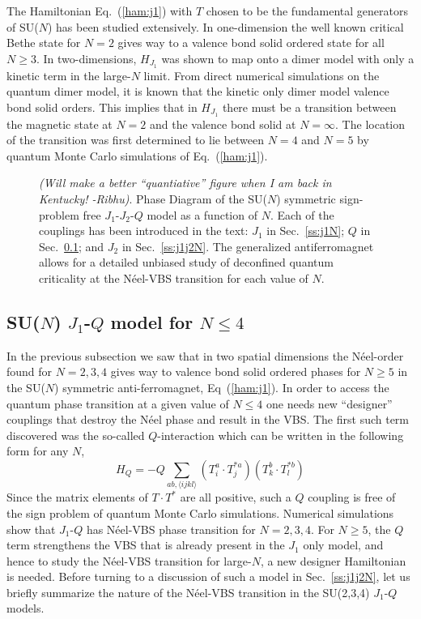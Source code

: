 \documentclass[range]{ar2e}
\begin{document}
The Hamiltonian Eq.~(\ref{ham:j1}) with $T$ chosen to be the
fundamental generators of SU($N$) has been studied extensively. In
one-dimension the well known critical Bethe state for $N=2$ gives way to a valence bond solid
ordered state for all $N\geq 3$.   In two-dimensions, $H_{J_1}$ was shown to map onto a dimer model
with only a kinetic term
in the large-$N$ limit. From direct numerical simulations
on the quantum dimer model, it is known that the kinetic only dimer model
valence bond solid orders.  This implies that in $H_{J_1}$ there must be a transition
between the magnetic state at $N=2$ and the valence bond solid at
$N=\infty$.  The location of the transition was first
determined to lie between $N=4$ and $N=5$ by quantum Monte Carlo
simulations of Eq.~(\ref{ham:j1}).


\begin{figure}
  \caption{ \label{fig:pdj1j2q} {\em (Will make a better ``quantiative''
      figure when  I am back in Kentucky! -Ribhu)}. Phase Diagram of the
    SU($N$) symmetric sign-problem free
    $J_1$-$J_2$-$Q$ model as a function of $N$. Each of the couplings has been introduced
    in the text: $J_1$ in Sec.~\ref{ss:j1N}; $Q$ in Sec.~\ref{ss:jqN};
  and $J_2$ in Sec.~\ref{ss:j1j2N}. The generalized antiferromagnet
  allows for a detailed unbiased study of deconfined quantum
  criticality at the N\'eel-VBS transition for each value of $N$. }
\end{figure}


\subsection{SU($N$) $J_1$-$Q$ model for $N\leq 4$}
\label{ss:jqN}
In the previous subsection we saw that in two spatial dimensions the
N\'eel-order found for $N=2,3,4$ gives way to valence bond solid
ordered phases for $N\geq 5$ in the SU($N$) symmetric
anti-ferromagnet, Eq~(\ref{ham:j1}). In order to access the quantum
phase transition at a given value of $N\leq 4$ one needs new
``designer'' couplings that
destroy the N\'eel phase and result in the VBS. The first such term discovered was
the so-called $Q$-interaction which can be written in the following
form for any $N$,
\begin{equation}
H_{Q} = - Q \sum_{ab,\langle ijkl \rangle} \left ( T^a_i\cdot
  T^{*a}_j\right ) \left ( T^b_k\cdot T^{*b}_l \right )
\end{equation}
Since the matrix elements of $T\cdot T^*$ are all positive, such a $Q$
coupling is free of the sign problem of quantum Monte Carlo
simulations. Numerical simulations show that $J_1$-$Q$ has N\'eel-VBS
phase transition for $N=2,3,4$. For $N\geq 5$, the $Q$ term strengthens
the VBS that is already present in the $J_1$ only model, and hence to
study the N\'eel-VBS transition for large-$N$, a new designer
Hamiltonian is needed. Before turning to a discussion of such a model in
Sec.~\ref{ss:j1j2N}, let us briefly summarize the nature of the
N\'eel-VBS transition in the SU(2,3,4) $J_1$-$Q$ models.
\end{document}
